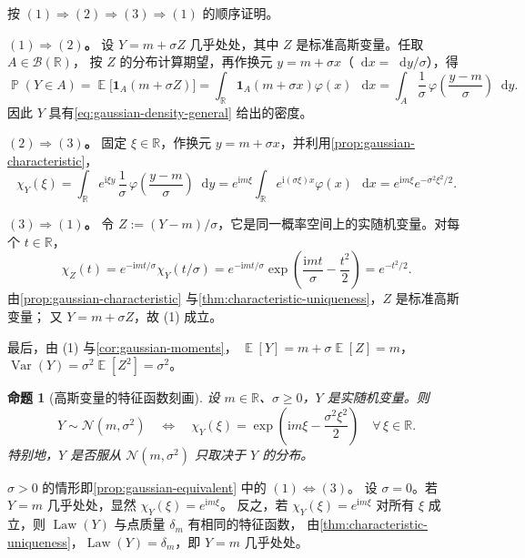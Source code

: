 \documentclass[UTF8,11pt,a4paper,oneside,fontset=fandol]{ctexrep}
\makeatletter
\numberwithin{equation}{section}
\theoremstyle{zhthm}
\newtheorem{proposition}[theorem]{命题}
\renewenvironment{proof}[1][\proofname]{\par
  \pushQED{\qed}%
  \normalfont\topsep6\p@\@plus6\p@\relax
  \trivlist
  \item[\hskip\labelsep\bfseries#1\hspace{0.5em}]\ignorespaces
}{%
  \popQED\endtrivlist\@endpefalse
}
\renewcommand{\proofname}{证明}
\newcommand{\R}{\mathbb{R}}
\newcommand{\B}{\mathcal{B}}
\DeclareMathOperator{\Prob}{\mathbb{P}}
\DeclareMathOperator{\E}{\mathbb{E}}
\DeclareMathOperator{\Var}{Var}
\DeclareMathOperator{\Law}{Law}
\newcommand{\Normal}{\mathcal{N}}
\newcommand{\iu}{\mathrm{i}}
\newcommand{\ind}[1]{\mathbf{1}_{#1}}
\newcommand{\dd}{\mathop{}\!\mathrm{d}}
\makeatother
\begin{document}
\begin{proof}
按 $(1)\Rightarrow(2)\Rightarrow(3)\Rightarrow(1)$ 的顺序证明。

\textbf{\boldmath$(1)\Rightarrow(2)$。}
设 $Y=m+\sigma Z$ 几乎处处，其中 $Z$ 是标准高斯变量。任取 $A\in\B(\R)$，
按 $Z$ 的分布计算期望，再作换元 $y=m+\sigma x$（$\dd x=\dd y/\sigma$），得
\[
  \Prob(Y\in A)=\E\bigl[\ind{A}(m+\sigma Z)\bigr]
  =\int_{\R}\ind{A}(m+\sigma x)\varphi(x)\,\dd x
  =\int_A\frac1\sigma\,\varphi\!\left(\frac{y-m}{\sigma}\right)\dd y.
\]
因此 $Y$ 具有\cref{eq:gaussian-density-general} 给出的密度。

\textbf{\boldmath$(2)\Rightarrow(3)$。}
固定 $\xi\in\R$，作换元 $y=m+\sigma x$，并利用\cref{prop:gaussian-characteristic}，
\[
  \chi_Y(\xi)
  =\int_{\R}e^{\iu\xi y}\,\frac1\sigma\,\varphi\!\left(\frac{y-m}{\sigma}\right)\dd y
  =e^{\iu m\xi}\int_{\R}e^{\iu(\sigma\xi)x}\varphi(x)\,\dd x
  =e^{\iu m\xi}e^{-\sigma^2\xi^2/2}.
\]

\textbf{\boldmath$(3)\Rightarrow(1)$。}
令 $Z:=(Y-m)/\sigma$，它是同一概率空间上的实随机变量。对每个 $t\in\R$，
\[
  \chi_Z(t)=e^{-\iu mt/\sigma}\chi_Y(t/\sigma)
  =e^{-\iu mt/\sigma}\exp\!\left(\frac{\iu mt}{\sigma}-\frac{t^2}{2}\right)
  =e^{-t^2/2}.
\]
由\cref{prop:gaussian-characteristic} 与\cref{thm:characteristic-uniqueness}，$Z$ 是标准高斯变量；
又 $Y=m+\sigma Z$，故 (1) 成立。

最后，由 (1) 与\cref{cor:gaussian-moments}，
$\E[Y]=m+\sigma\E[Z]=m$，$\Var(Y)=\sigma^2\E[Z^2]=\sigma^2$。
\end{proof}

\begin{proposition}[高斯变量的特征函数刻画]
\label{prop:gaussian-characteristic-criterion}
设 $m\in\R$、$\sigma\ge0$，$Y$ 是实随机变量。则
\begin{equation}
  \label{eq:gaussian-characteristic-unified}
  Y\sim\Normal(m,\sigma^2)
  \quad\Longleftrightarrow\quad
  \chi_Y(\xi)=\exp\!\left(\iu m\xi-\frac{\sigma^2\xi^2}{2}\right)
  \quad\forall\,\xi\in\R.
\end{equation}
特别地，$Y$ 是否服从 $\Normal(m,\sigma^2)$ 只取决于 $Y$ 的分布。
\end{proposition}

\begin{proof}
$\sigma>0$ 的情形即\cref{prop:gaussian-equivalent} 中的 $(1)\Leftrightarrow(3)$。
设 $\sigma=0$。若 $Y=m$ 几乎处处，显然 $\chi_Y(\xi)=e^{\iu m\xi}$。
反之，若 $\chi_Y(\xi)=e^{\iu m\xi}$ 对所有 $\xi$ 成立，则 $\Law(Y)$ 与点质量 $\delta_m$ 有相同的特征函数，
由\cref{thm:characteristic-uniqueness}，$\Law(Y)=\delta_m$，即 $Y=m$ 几乎处处。
\end{proof}
\end{document}
